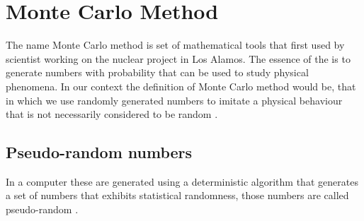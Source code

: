       
\section{Monte Carlo Method}
The name Monte Carlo method is set of mathematical tools that first used by scientist working on the nuclear project in Los Alamos. The essence of the is to generate numbers with probability that can be used to study physical phenomena. In our context the definition of Monte Carlo method would be, that in which we use randomly generated numbers to imitate a physical behaviour that is not necessarily considered to be random \citep{montecarlo}.

\subsection{Pseudo-random numbers}
In a computer these are generated using a deterministic algorithm that generates a set of numbers that exhibits statistical randomness, those numbers are called pseudo-random \citep{montecarlo}.
%
%
%
%
%
%
%


